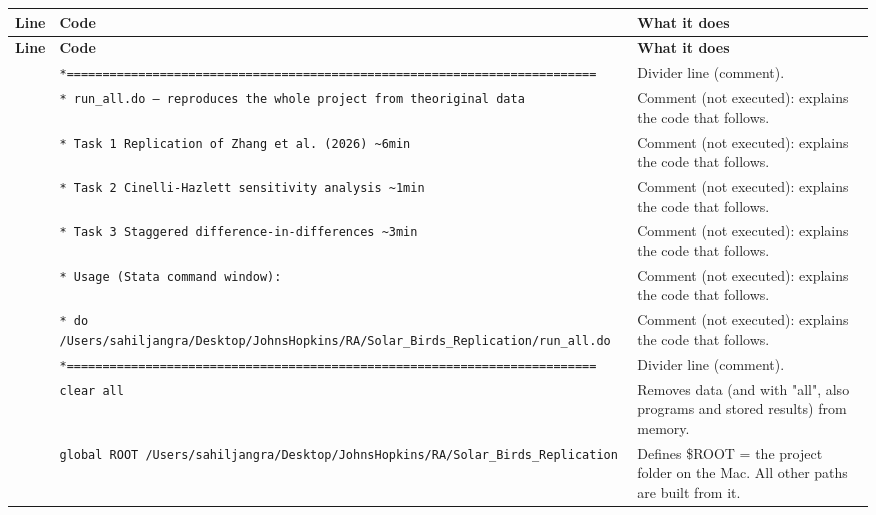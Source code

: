 \documentclass[10pt]{article}
\newcommand{\codetable}[1]{%
{\footnotesize
\begin{longtable}{>{\raggedleft\arraybackslash}p{0.55cm}>{\raggedright\arraybackslash}p{8.3cm}>{\raggedright\arraybackslash}p{8.0cm}}
\toprule \textbf{Line} & \textbf{Code} & \textbf{What it does}\\ \midrule \endfirsthead
\toprule \textbf{Line} & \textbf{Code} & \textbf{What it does}\\ \midrule \endhead
\bottomrule \endfoot
#1
\end{longtable}}}
\begin{document}
\codetable{1 & \texttt{*=========================================================\newline \hspace*{1em}=================} & Divider line (comment).\\
2 & \texttt{* run\_all.do  —  reproduces the whole project from the\newline \hspace*{1em}original data} & Comment (not executed): explains the code that follows.\\
3 & \texttt{*   Task 1  Replication of Zhang et al. (2026)        \textasciitilde{}6\newline \hspace*{1em}min} & Comment (not executed): explains the code that follows.\\
4 & \texttt{*   Task 2  Cinelli-{}Hazlett sensitivity analysis      \textasciitilde{}1\newline \hspace*{1em}min} & Comment (not executed): explains the code that follows.\\
5 & \texttt{*   Task 3  Staggered difference-{}in-{}differences       \textasciitilde{}3\newline \hspace*{1em}min} & Comment (not executed): explains the code that follows.\\
6 & \texttt{* Usage (Stata command window):} & Comment (not executed): explains the code that follows.\\
7 & \texttt{*   do \textquotedbl{}/Users/sahiljangra/Desktop/Johns\newline \hspace*{1em}Hopkins/RA/Solar\_Birds\_Replication/run\_all.do\textquotedbl{}} & Comment (not executed): explains the code that follows.\\
8 & \texttt{*=========================================================\newline \hspace*{1em}=================} & Divider line (comment).\\
9 & \texttt{clear all} & Removes data (and with "all", also programs and stored results) from memory.\\
10 & \texttt{global ROOT \textquotedbl{}/Users/sahiljangra/Desktop/Johns\newline \hspace*{1em}Hopkins/RA/Solar\_Birds\_Replication\textquotedbl{}} & Defines \$ROOT = the project folder on the Mac. All other paths are built from it.\\
}
\end{document}
